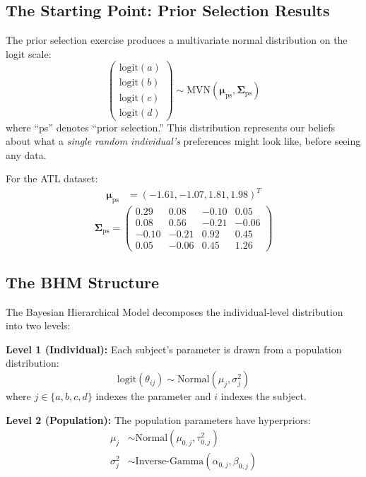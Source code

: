 \documentclass[11pt]{article}
\begin{document}
\subsection{The Starting Point: Prior Selection Results}

The prior selection exercise produces a multivariate normal distribution on the logit scale:
\[
  \begin{pmatrix} \text{logit}(a) \\ \text{logit}(b) \\ \text{logit}(c) \\ \text{logit}(d) \end{pmatrix}
  \sim \text{MVN}(\boldsymbol{\mu}_{\text{ps}}, \boldsymbol{\Sigma}_{\text{ps}})
\]
where ``ps'' denotes ``prior selection.'' This distribution represents our beliefs about what a \textit{single random individual's} preferences might look like, before seeing any data.

For the ATL dataset:
\begin{align*}
  \boldsymbol{\mu}_{\text{ps}} &= (-1.61, -1.07, 1.81, 1.98)^T
\end{align*}
\[
  \boldsymbol{\Sigma}_{\text{ps}} = \begin{pmatrix}
    0.29 & 0.08 & -0.10 & 0.05 \\
    0.08 & 0.56 & -0.21 & -0.06 \\
    -0.10 & -0.21 & 0.92 & 0.45 \\
    0.05 & -0.06 & 0.45 & 1.26
  \end{pmatrix}
\]

\subsection{The BHM Structure}

The Bayesian Hierarchical Model decomposes the individual-level distribution into two levels:

\textbf{Level 1 (Individual):} Each subject's parameter is drawn from a population distribution:
\[
  \text{logit}(\theta_{ij}) \sim \text{Normal}(\mu_j, \sigma_j^2)
\]
where $j \in \{a, b, c, d\}$ indexes the parameter and $i$ indexes the subject.

\textbf{Level 2 (Population):} The population parameters have hyperpriors:
\begin{align}
  \mu_j &\sim \text{Normal}(\mu_{0,j}, \tau_{0,j}^2) \\
  \sigma_j^2 &\sim \text{Inverse-Gamma}(\alpha_{0,j}, \beta_{0,j})
\end{align}
\end{document}
